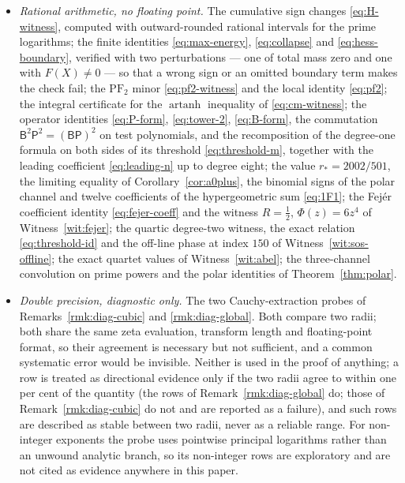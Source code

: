 \documentclass[11pt]{amsart}
\theoremstyle{definition}
\theoremstyle{remark}
\theoremstyle{definition}
\newcommand{\artanh}{\operatorname{artanh}}
\newcommand{\Pp}{\mathsf{P}}
\newcommand{\Bb}{\mathsf{B}}
\begin{document}
\begin{itemize}[leftmargin=*]
\item \emph{Rational arithmetic, no floating point.} The cumulative sign changes
      \eqref{eq:H-witness}, computed with outward-rounded rational intervals for the prime
      logarithms; the finite identities \eqref{eq:max-energy}, \eqref{eq:collapse} and
      \eqref{eq:hess-boundary}, verified with two perturbations --- one of total mass zero and one
      with $F(X)\ne0$ --- so that a wrong sign or an omitted boundary term makes the check fail; the
      $\mathrm{PF}_2$ minor \eqref{eq:pf2-witness} and the local identity \eqref{eq:pf2}; the
      integral certificate for the $\artanh$ inequality of \eqref{eq:cm-witness}; the operator
      identities \eqref{eq:P-form}, \eqref{eq:tower-2}, \eqref{eq:B-form}, the commutation
      $\Bb^2\Pp^2=(\Bb\Pp)^2$ on test polynomials, and the recomposition of the degree-one formula
      on both sides of its threshold \eqref{eq:threshold-m}, together with the leading coefficient
      \eqref{eq:leading-n} up to degree eight; the value $r_*=2002/501$, the limiting equality of
      Corollary~\ref{cor:a0plus}, the binomial signs of the polar channel and twelve coefficients of the
      hypergeometric sum \eqref{eq:1F1}; the Fej\'er coefficient identity \eqref{eq:fejer-coeff}
      and the witness $R=\tfrac12$, $\Phi(z)=6z^4$ of Witness~\ref{wit:fejer}; the quartic
      degree-two witness, the exact relation \eqref{eq:threshold-id} and the off-line phase at
      index $150$ of Witness~\ref{wit:sos-offline}; the exact quartet values of
      Witness~\ref{wit:abel}; the three-channel convolution on prime powers and the polar
      identities of Theorem~\ref{thm:polar}.
\item \emph{Double precision, diagnostic only.} The two Cauchy-extraction probes of
      Remarks~\ref{rmk:diag-cubic} and \ref{rmk:diag-global}. Both compare two radii; both share the
      same zeta evaluation, transform length and floating-point format, so their agreement is
      necessary but not sufficient, and a common systematic error would be invisible. Neither is
      used in the proof of anything; a row is treated as directional evidence only if the two radii agree to within one per
      cent of the quantity (the rows of Remark~\ref{rmk:diag-global} do; those of
      Remark~\ref{rmk:diag-cubic} do not and are reported as a failure), and such rows are described as stable between two radii, never as a
      reliable range. For non-integer exponents the probe uses pointwise principal logarithms rather
      than an unwound analytic branch, so its non-integer rows are exploratory and are not cited as
      evidence anywhere in this paper.
\end{itemize}
\end{document}
